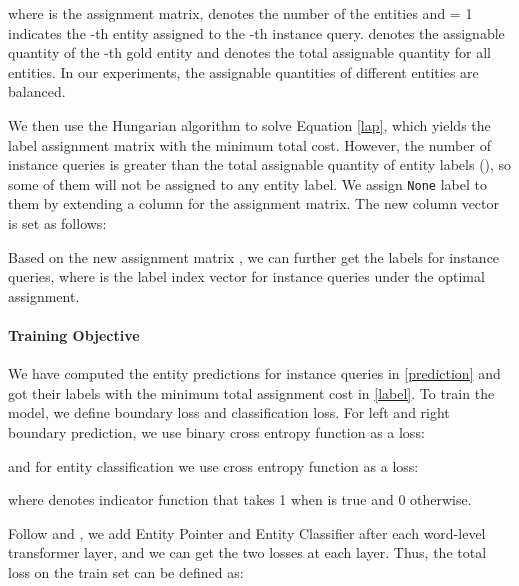 \documentclass[11pt]{article}
\begin{document}
\noindent where  is the assignment matrix,  denotes the number of the entities and  = 1 indicates the -th entity assigned to the -th instance query.
 denotes the assignable quantity of the -th gold entity and  denotes the total assignable quantity for all entities.
In our experiments, the assignable quantities of different entities are balanced. 


We then use the Hungarian \citep{kuhn1955hungarian} algorithm to solve Equation \ref{lap}, which yields the label assignment matrix with the minimum total cost. However, the number of instance queries is greater than the total assignable quantity of entity labels (), so some of them will not be assigned to any entity label. 
We assign \texttt{None} label to them by extending a column for the assignment matrix. The new column vector  is set as follows:



Based on the new assignment matrix , we can further get the labels  for  instance queries,
\noindent where  is the label index vector for instance queries under the optimal assignment.






\paragraph{Training Objective}


We have computed the entity predictions for  instance queries in \cref{prediction} and got their labels  with the minimum total assignment cost in \cref{label}. To train the model, we define boundary loss and classification loss. For left and right boundary prediction, we use binary cross entropy function as a loss:






\noindent and for entity classification we use cross entropy function as a loss:







\noindent where  denotes indicator function that takes 1 when  is true and 0 otherwise.

Follow \citet{article} and \citet{10.1007/978-3-030-58452-8_13}, we add Entity Pointer and Entity Classifier after each word-level transformer layer, and we can get the two losses at each layer. Thus, the total loss on the train set  can be defined as:
\end{document}
